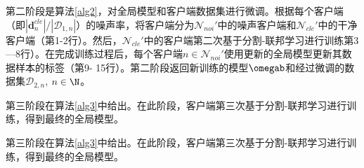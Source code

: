 


第二阶段是算法\ref{alg2}，对全局模型和客户端数据集进行微调。根据每个客户端（即${|\boldsymbol{d}_n^{cle}|}/{|\mathcal{D}_{1,n}|}$）的噪声率，将客户端分为$\mathcal{N}_{noi}'$中的噪声客户端和$\mathcal{N}_{cle}'$中的干净客户端（第1-2行）。然后，$\mathcal{N}_{cle}'$中的客户端第二次基于分割-联邦学习进行训练第3—8行）。在完成训练过程后，每个客户端$n\in \mathcal{N}_{noi}'$使用更新的全局模型更新其数据样本的标签（第9- 15行）。第二阶段返回新训练的模型$\omegab$和经过微调的数据集$\mathcal{D}_{2,n}$, $n\in\N$。

第三阶段在算法\ref{alg3}中给出。在此阶段，客户端第三次基于分割-联邦学习进行训练，得到最终的全局模型。

第三阶段在算法\ref{alg3}中给出。在此阶段，客户端第三次基于分割-联邦学习进行训练，得到最终的全局模型。

